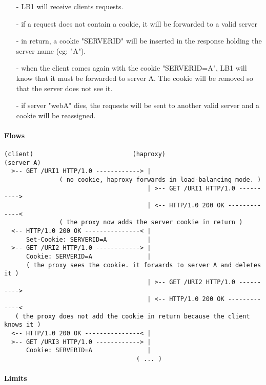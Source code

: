 \begin{itemize}
\item[-] LB1 will receive clients requests.
\item[-] if a request does not contain a cookie, it will be forwarded to a valid
   server
\item[-] in return, a cookie "SERVERID" will be inserted in the response holding the
   server name (eg: "A").
\item[-] when the client comes again with the cookie "SERVERID=A", LB1 will know that
   it must be forwarded to server A. The cookie will be removed so that the
   server does not see it.
\item[-] if server "webA" dies, the requests will be sent to another valid server
   and a cookie will be reassigned.
\end{itemize}

\paragraph{Flows}

\begin{verbatim}
(client)                           (haproxy)                         (server A)
  >-- GET /URI1 HTTP/1.0 ------------> |
               ( no cookie, haproxy forwards in load-balancing mode. )
                                       | >-- GET /URI1 HTTP/1.0 ---------->
                                       | <-- HTTP/1.0 200 OK -------------<
               ( the proxy now adds the server cookie in return )
  <-- HTTP/1.0 200 OK ---------------< |
      Set-Cookie: SERVERID=A           |
  >-- GET /URI2 HTTP/1.0 ------------> |
      Cookie: SERVERID=A               |
      ( the proxy sees the cookie. it forwards to server A and deletes it )
                                       | >-- GET /URI2 HTTP/1.0 ---------->
                                       | <-- HTTP/1.0 200 OK -------------<
   ( the proxy does not add the cookie in return because the client knows it )
  <-- HTTP/1.0 200 OK ---------------< |
  >-- GET /URI3 HTTP/1.0 ------------> |
      Cookie: SERVERID=A               |
                                    ( ... )
\end{verbatim}

\paragraph{Limits}

